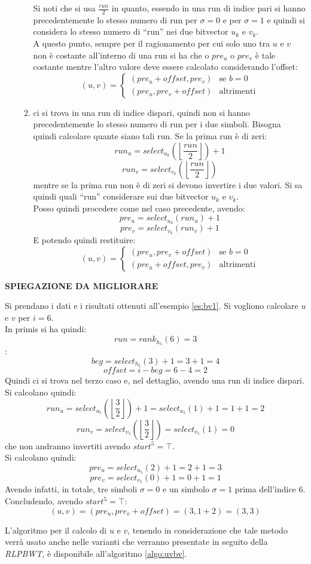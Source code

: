 \begin{enumerate}
\begin{enumerate}
    Si noti che si usa $\frac{run}{2}$ in quanto, essendo in una run di indice
    pari si hanno precedentemente lo stesso numero di run per $\sigma=0$ e per
    $\sigma=1$ e quindi si considera lo stesso numero di ``run'' nei due
    bitvector $u_k$ e $v_k$.\\
    A questo punto, sempre per il ragionamento per cui solo uno tra $u$ e $v$
    non è costante all'interno di una run si ha che o $pre_u$ o $pre_v$ è tale
    costante mentre l'altro valore deve essere calcolato considerando l'offset:
    \[(u,v)=
      \begin{cases}
        (pre_u+offset,pre_v)&\mbox{se } b=0\\
        (pre_u,pre_v+offset)&\mbox{altrimenti}
      \end{cases}
    \]
    \item ci si trova in una run di indice dispari, quindi non si hanno
    precedentemente lo stesso numero di run per i due simboli. Bisogna quindi
    calcolare quante siano tali run. Se la prima run è di zeri:
    \[run_u=select_{u_k}\left(\left\lfloor\frac{run}{2}\right\rfloor\right)+1\]
    \[run_v=select_{v_k}\left(\left\lfloor\frac{run}{2}\right\rfloor\right)\]
    mentre se la prima run non è di zeri si devono invertire i due valori. Si sa
    quindi quali ``run'' considerare sui due bitvector $u_k$ e $v_k$.\\
    Posso quindi procedere come nel caso precedente, avendo:
    \[pre_u=select_{u_k}(run_u)+1\]
    \[pre_v=select_{v_k}(run_v)+1\]
    E potendo quindi restituire:
    \[(u,v)=
      \begin{cases}
        (pre_u,pre_v+offset)&\mbox{se } b=0\\
        (pre_u+offset,pre_v)&\mbox{altrimenti}
      \end{cases}
    \]
  \end{enumerate}
\end{enumerate}
\textbf{SPIEGAZIONE DA MIGLIORARE}
\begin{esempio}
  Si prendano i dati e i risultati ottenuti all'esempio \ref{es:bv1}. Si
  vogliono calcolare $u$ e $v$ per $i=6$.\\
  In primis si ha quindi:
  \[run=rank_{h_5}(6)=3\]:
  \[beg = select_{h_5}(3)+1=3+1=4\]
  \[offset = i-beg=6-4=2\]
  Quindi ci si trova nel terzo caso e, nel dettaglio, avendo una run di
  indice dispari. Si calcolano quindi:
  \[run_u=select_{u_5}\left(\left\lfloor\frac{3}{2}\right\rfloor\right)+1=
    select_{u_5}(1)+1
    =1+1=2\] 
  \[run_v=select_{v_5}\left(\left\lfloor\frac{3}{2}\right\rfloor\right)=
    select_{v_5}(1)=0\] 
  che non andranno invertiti avendo $start^5=\top$.\\
  Si calcolano quindi:
  \[pre_u=select_{u_5}(2)+1=2+1=3\]
  \[pre_v=select_{v_5}(0)+1=0+1=1\]
  Avendo infatti, in totale, tre simboli $\sigma=0$ e un simbolo $\sigma=1$
  prima dell'indice 6.\\ 
  Concludendo, avendo $start^5=\top$:
  \[(u,v)=(pre_u, pre_v + offset)=(3,1+2)=(3,3)\]
\end{esempio}
L'algoritmo per il calcolo di $u$ e $v$, tenendo in considerazione che tale
metodo verrà usato anche nelle varianti che verranno presentate in seguito della
\textit{RLPBWT}, è disponibile all'algoritmo \ref{algo:uvbv}.